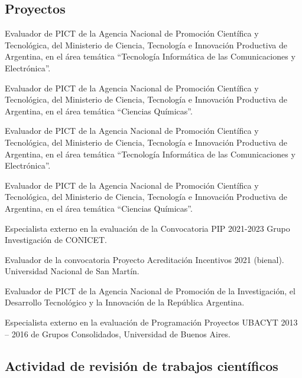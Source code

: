 \subsection{Proyectos}

 Evaluador de PICT de la Agencia Nacional de Promoción Científica y Tecnológica, del Ministerio de Ciencia, Tecnología e Innovación Productiva de Argentina, en el área temática ``Tecnología Informática de las Comunicaciones y Electrónica''.

 Evaluador de PICT de la Agencia Nacional de Promoción Científica y Tecnológica, del Ministerio de Ciencia, Tecnología e
Innovación Productiva de Argentina, en el área temática ``Ciencias Químicas''.

 Evaluador de PICT de la Agencia Nacional de Promoción Científica y Tecnológica, del Ministerio de Ciencia, Tecnología e
Innovación Productiva de Argentina, en el área temática ``Tecnología Informática de las Comunicaciones y Electrónica''.

 Evaluador de PICT de la Agencia Nacional de Promoción Científica y Tecnológica, del Ministerio de Ciencia, Tecnología e
Innovación Productiva de Argentina, en el área temática ``Ciencias Químicas''.

 Especialista externo en la evaluación de la Convocatoria PIP 2021-2023 Grupo Investigación de CONICET.

 Evaluador de la convocatoria Proyecto Acreditación Incentivos 2021 (bienal). Universidad Nacional de San Martín.

 Evaluador de PICT de la Agencia Nacional de Promoción de la Investigación, el Desarrollo Tecnológico y la Innovación de la República Argentina.

 Especialista externo en la evaluación de Programación Proyectos UBACYT 2013 -- 2016 de Grupos Consolidados, Universidad de Buenos Aires.

\subsection{Actividad de revisión de trabajos científicos}


